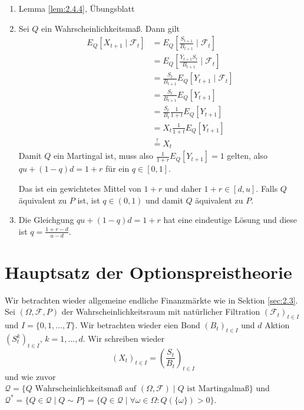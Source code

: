 \documentclass[a4paper,twoside,DIV15,BCOR12mm]{scrbook}
\newcommand{\cF}{\mathcal F}
\newcommand{\cQ}{\mathcal Q}
\begin{document}
\begin{beweis}
\begin{enumerate}
\item Lemma \ref{lem:2.4.4}, Übungsblatt
\item Sei $Q$ ein Wahrscheinlichkeitsmaß. Dann gilt
\begin{align*}
E_Q[X_{t+1}\mid \cF_t]
&= E_Q[\frac{S_{t+1}}{B_{t+1}} \mid\cF_t] \\
&= E_Q[\frac{Y_{t+1}S_t}{B_{t+1}} \mid \cF_t] \\
&= \frac{S_t}{B_{t+1}} E_Q[Y_{t+1} \mid \cF_t] \\
&= \frac{S_t}{B_{t+1}} E_Q[Y_{t+1}] \\
&= \frac{S_t}{B_t} \frac{1}{1+t} E_Q[Y_{t+1}] \\
&= X_t \frac{1}{1+t} E_Q[Y_{t+1}] \\
&\stackrel ! = X_t 
\end{align*}
Damit $Q$ ein Martingal ist, muss also $\frac{1}{1+r} E_Q[Y_{t+1}] = 1$ gelten, also $qu + (1-q)d = 1+r$ für ein $q\in[0, 1]$.

Das ist ein gewichtetes Mittel von $1+r$ und daher $1+r\in [d,u]$. Falls $Q$ äquivalent zu $P$ ist, ist $q\in(0, 1)$ und damit $Q$ äquivalent zu $P$.
\item Die Gleichgung $qu + (1-q)d = 1+r$  hat eine eindeutige Lösung und diese ist $q=\frac{1+r-d}{u-d}$.
\end{enumerate}
\end{beweis}

\section{Hauptsatz der Optionspreistheorie}

Wir betrachten wieder allgemeine endliche Finanzmärkte wie in Sektion \ref{sec:2.3}. Sei $(\Omega, \cF, P)$ der Wahrscheinlichkeitsraum mit natürlicher Filtration $(\cF_t)_{t\in I}$ und $I=\{0, 1,\ldots, T\}$. Wir betrachten wieder eien Bond $(B_t)_{t\in I}$ und $d$ Aktion $(S_t^k)_{t\in I}$, $k=1,\ldots,d$. Wir schreiben wieder
\[
(X_t)_{t\in I} =\left( \frac{S_t}{B_t}\right)_{t\in I}
\]
und wie zuvor $\cQ= \{Q \text{ Wahrscheinlichkeitsmaß auf } (\Omega,\cF)\mid Q \text{ ist Martingalmaß}\}$ und $\cQ^* = \{Q\in \cQ\mid Q \sim P\} = \{Q\in \cQ \mid \forall \omega\in \Omega: Q(\{\omega\}) > 0\}$.
\end{document}
